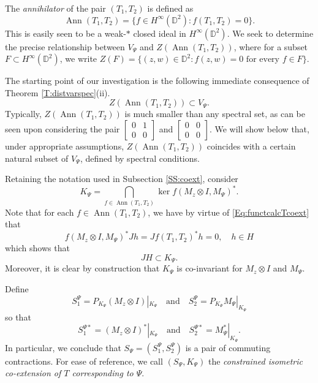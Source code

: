 \documentclass[10pt]{amsart}
\newcommand{\bD}{{\mathbb{D}}}
\newcommand{\qand}{\quad\text{and}\quad}
\newcommand{\Ann}{\operatorname{Ann}}
\theoremstyle{definition}
\begin{document}
The \emph{annihilator} of the pair $(T_1,T_2)$ is  defined as
 \[\Ann(T_1,T_2)=\{f\in H^\infty(\bD^2):f(T_1,T_2)=0\}.\]  
 This is easily seen to be a weak-$*$ closed ideal in $H^\infty(\bD^2)$. We seek to determine the precise relationship between $V_\Psi$ and $Z(\Ann(T_1,T_2))$, where for a subset $F\subset H^\infty(\bD^2)$, we write $Z(F)=\{(z,w)\in\bD^2:f(z,w)=0 \text{ for every } f\in F \}$. 

The starting point of our investigation is the following immediate consequence of Theorem  \ref{T:distvarspec}(ii).
\begin{equation}\label{Eq:ZannV}
Z(\Ann(T_1,T_2))\subset V_\Psi.
\end{equation}
Typically, $Z(\Ann(T_1,T_2))$ is much smaller than any spectral set, as can be seen upon considering the pair $\begin{bmatrix} 0 & 1 \\ 0 & 0 \end{bmatrix}$ and $\begin{bmatrix} 0 & 0 \\ 0 & 0 \end{bmatrix}$. We will show below that, under appropriate assumptions, $Z(\Ann(T_1,T_2))$ coincides with a certain natural subset of $V_\Psi$, defined by spectral conditions.

Retaining the notation used in Subsection \ref{SS:coext}, consider 
\[
K_\Psi=\bigcap_{f\in \Ann(T_1,T_2)} \ker f(M_z\otimes I,M_\Psi)^*.
\]
Note that for each $f\in \Ann(T_1,T_2)$, we have by virtue of \eqref{Eq:functcalcTcoext} that
\[
f(M_z\otimes I,M_\Psi)^*Jh=Jf(T_1,T_2)^*h=0, \quad h\in H
\]
which shows that 
\begin{equation}\label{Eq:JH}
JH\subset K_\Psi. 
\end{equation}
Moreover, it is clear by construction that $K_\Psi$ is co-invariant for $M_z\otimes I$ and $M_\Psi$. 

Define 
\begin{equation}\label{Eq:S}
S^\Psi_1=P_{K_\Psi} (M_z\otimes I)|_{K_\Psi} \qand S^\Psi_2 = P_{K_\Psi} M_\Psi|_{K_\Psi}
\end{equation}
so that
\begin{equation}\label{Eq:S*}
S^{\Psi*}_1=(M_z\otimes I)^*|_{K_\Psi} \qand S_2^{\Psi *}=M^*_\Psi|_{K_\Psi}.
\end{equation}
In particular, we conclude that $S_\Psi=(S^\Psi_1,S^\Psi_2)$ is a pair of commuting contractions. For ease of reference, we call  $(S_\Psi,K_\Psi)$ the \emph{constrained isometric co-extension of $T$ corresponding to $\Psi$}.
\end{document}
